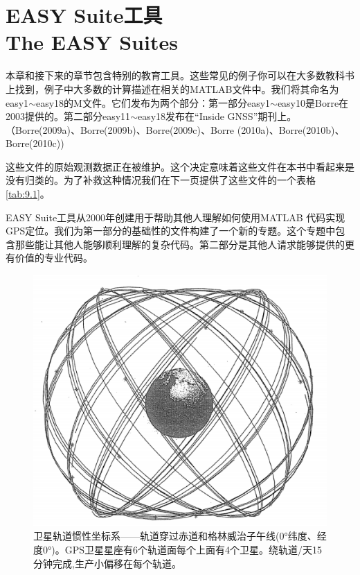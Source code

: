 \section[EASY Suite工具]{EASY Suite工具\\The EASY Suites}
本章和接下来的章节包含特别的教育工具。这些常见的例子你可以在大多数教科书上找到，例子中大多数的计算描述在相关的MATLAB文件中。我们将其命名为easy1$\sim$easy18的M文件。它们发布为两个部分：第一部分easy1$\sim$easy10是Borre在2003提供的。第二部分easy11$\sim$easy18发布在“Inside GNSS”期刊上。（Borre(2009a)、Borre(2009b)、Borre(2009c)、Borre (2010a)、Borre(2010b)、Borre(2010c)) 

这些文件的原始观测数据正在被维护。这个决定意味着这些文件在本书中看起来是没有归类的。为了补救这种情况我们在下一页提供了这些文件的一个表格\ref{tab:9.1}。

EASY Suite工具从2000年创建用于帮助其他人理解如何使用MATLAB 代码实现GPS定位。我们为第一部分的基础性的文件构建了一个新的专题。这个专题中包含那些能让其他人能够顺利理解的复杂代码。第二部分是其他人请求能够提供的更有价值的专业代码。
\begin{figure}[H]
	\centering
	\includegraphics[width=0.4\linewidth]{TeX_files/Part03/chapter09/image/9-1}
	\caption{卫星轨道惯性坐标系——轨道穿过赤道和格林威治子午线(0°纬度、经度0°)。GPS卫星星座有6个轨道面每个上面有4个卫星。绕轨道/天15分钟完成,生产小偏移在每个轨道。}
	\label{fig:9-1}
\end{figure}
